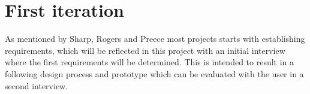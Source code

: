 \section{First iteration}
As mentioned by Sharp, Rogers and Preece most projects starts with establishing requirements, which will be reflected in this project with an initial interview where the first requirements will be determined. This is intended to result in a following design process and prototype which can be evaluated with the user in a second interview.

